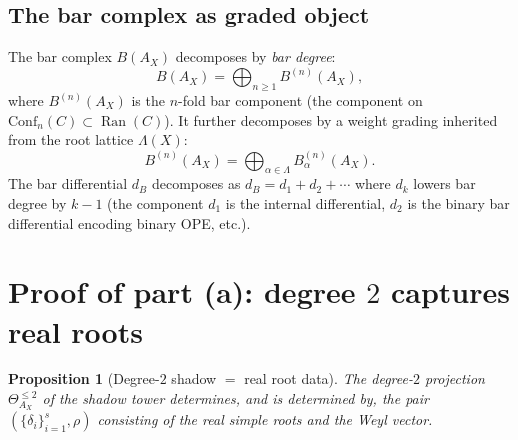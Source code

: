 \documentclass[11pt]{amsart}
\newtheorem{proposition}[theorem]{Proposition}
\theoremstyle{definition}
\theoremstyle{remark}
\DeclareMathOperator{\Ran}{Ran}
\begin{document}
\subsection{The bar complex as graded object}

The bar complex $B(A_X)$ decomposes by \emph{bar degree}:
\[
 B(A_X) = \bigoplus_{n \geq 1} B^{(n)}(A_X),
\]
where $B^{(n)}(A_X)$ is the $n$-fold bar component (the
component on $\mathrm{Conf}_n(C) \subset \Ran(C)$). It further
decomposes by a weight grading inherited from the root lattice
$\Lambda(X)$:
\[
 B^{(n)}(A_X) = \bigoplus_{\alpha \in \Lambda} B^{(n)}_\alpha(A_X).
\]
The bar differential $d_B$ decomposes as
$d_B = d_1 + d_2 + \cdots$ where $d_k$ lowers bar degree by
$k - 1$ (the component $d_1$ is the internal differential,
$d_2$ is the binary bar differential encoding binary OPE, etc.).

\section{Proof of part (a): degree $2$ captures real roots}
\label{sec:proof-a}

\begin{proposition}[Degree-$2$ shadow $=$ real root data]
\label{prop:degree-2}
The degree-$2$ projection $\Theta^{\leq 2}_{A_X}$ of the shadow
tower determines, and is determined by, the pair
$(\{\delta_i\}_{i=1}^s, \rho)$ consisting of the real simple
roots and the Weyl vector.
\end{proposition}
\end{document}
